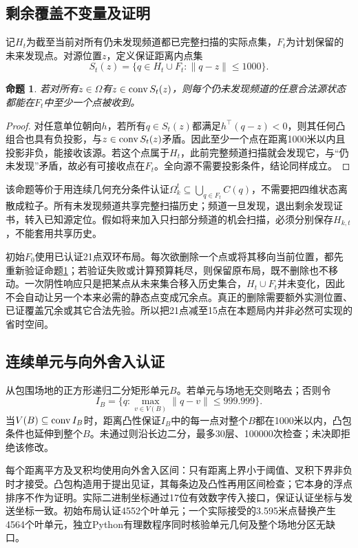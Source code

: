 \documentclass[UTF8,a4paper,zihao=-4,fontset=fandol]{ctexart}
\newtheorem{proposition}{命题}\allowdisplaybreaks[2]\emergencystretch=2em
\begin{document}
\subsection{剩余覆盖不变量及证明}
记$H_t$为截至当前对所有仍未发现频道都已完整扫描的实际点集，$F_t$为计划保留的未来发现点。对源位置$z$，定义保证距离内点集
\begin{equation}S_t(z)=\{q\in H_t\cup F_t:\|q-z\|\le1000\}.
\end{equation}
\begin{proposition}\label{prop:residual}
若对所有$z\in\Omega$有$z\in\operatorname{conv} S_t(z)$，则每个仍未发现频道的任意合法源状态都能在$F_t$中至少一个点被收到。
\end{proposition}
\begin{proof}
对任意单位朝向$h$，若所有$q\in S_t(z)$都满足$h^\top(q-z)<0$，则其任何凸组合也具有负投影，与$z\in\operatorname{conv} S_t(z)$矛盾。因此至少一个点在距离1000米以内且投影非负，能接收该源。若这个点属于$H_t$，此前完整频道扫描就会发现它，与“仍未发现”矛盾，故必有可接收点在$F_t$。全向源不需要投影条件，结论同样成立。\end{proof}

该命题等价于用连续几何充分条件认证$\Omega_k^t\subseteq\bigcup_{q\in F_t}C(q)$，不需要把四维状态离散成粒子。所有未发现频道共享完整扫描历史；频道一旦发现，退出剩余发现证书，转入已知源定位。假如将来加入只扫部分频道的机会扫描，必须分别保存$H_{k,t}$，不能套用共享历史。

初始$F_0$使用已认证21点双环布局。每次欲删除一个点或将其移向当前位置，都先重新验证命题\ref{prop:residual}；若验证失败或计算预算耗尽，则保留原布局，既不删除也不移动。一次阴性响应只是把某点从未来集合移入历史集合，$H_t\cup F_t$并未变化，因此不会自动让另一个本来必需的静态点变成冗余点。真正的删除需要额外实测位置、已证覆盖冗余或其它合法先验。所以把21点减至15点在本题局内并非必然可实现的省时空间。

\subsection{连续单元与向外舍入认证}
从包围场地的正方形递归二分矩形单元$B$。若单元与场地无交则略去；否则令
\begin{equation}I_B=\{q:\max_{v\in V(B)}\|q-v\|\le999.999\}.
\end{equation}
当$V(B)\subseteq\operatorname{conv} I_B$时，距离凸性保证$I_B$中的每一点对整个$B$都在1000米以内，凸包条件也延伸到整个$B$。未通过则沿长边二分，最多30层、100000次检查；未决即拒绝该修改。

每个距离平方及叉积均使用向外舍入区间：只有距离上界小于阈值、叉积下界非负时才接受。凸包构造用于提出见证，其每条边及凸性再用区间检查；它本身的浮点排序不作为证明。实际二进制坐标通过17位有效数字传入接口，保证认证坐标与发送坐标一致。初始布局认证4552个叶单元；一个实际接受的3.595米点替换产生4564个叶单元，独立Python有理数程序同时核验单元几何及整个场地分区无缺口。
\end{document}
